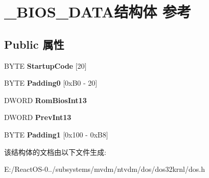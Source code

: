 \hypertarget{struct___b_i_o_s___d_a_t_a}{}\section{\+\_\+\+B\+I\+O\+S\+\_\+\+D\+A\+T\+A结构体 参考}
\label{struct___b_i_o_s___d_a_t_a}
\subsection*{Public 属性}
\begin{DoxyCompactItemize}
\item 
\mbox{\label{struct___b_i_o_s___d_a_t_a_a989a1b35042d3a9ba8d787f5ca7624d6}} 
B\+Y\+TE {\bfseries Startup\+Code} \mbox{[}20\mbox{]}
\item 
\mbox{\label{struct___b_i_o_s___d_a_t_a_a1cc7d1a5fbe0560115d8c62223b2ab14}} 
B\+Y\+TE {\bfseries Padding0} \mbox{[}0x\+B0 -\/ 20\mbox{]}
\item 
\mbox{\label{struct___b_i_o_s___d_a_t_a_a55f2214558a8fcd679d4ff6c8b2b3059}} 
D\+W\+O\+RD {\bfseries Rom\+Bios\+Int13}
\item 
\mbox{\label{struct___b_i_o_s___d_a_t_a_a3595263e5735d43c049fd5b4b2c6088d}} 
D\+W\+O\+RD {\bfseries Prev\+Int13}
\item 
\mbox{\label{struct___b_i_o_s___d_a_t_a_ac35b9a24dc7d334581a02d83464d4b85}} 
B\+Y\+TE {\bfseries Padding1} \mbox{[}0x100 -\/ 0x\+B8\mbox{]}
\end{DoxyCompactItemize}


该结构体的文档由以下文件生成\+:\begin{DoxyCompactItemize}
\item 
E\+:/\+React\+O\+S-\/0../subsystems/mvdm/ntvdm/dos/dos32krnl/dos.\+h\end{DoxyCompactItemize}
